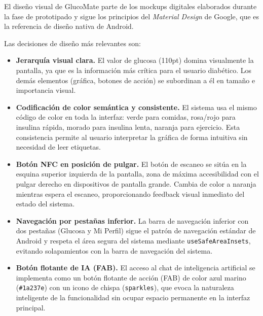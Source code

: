 El diseño visual de GlucoMate parte de los mockups digitales elaborados durante la
fase de prototipado y sigue los principios del \textit{Material Design} de Google,
que es la referencia de diseño nativa de Android.

Las decisiones de diseño más relevantes son:

\begin{itemize}
    \item \textbf{Jerarquía visual clara.} El valor de glucosa (110pt) domina
          visualmente la pantalla, ya que es la información más crítica para el
          usuario diabético. Los demás elementos (gráfica, botones de acción) se
          subordinan a él en tamaño e importancia visual.

    \item \textbf{Codificación de color semántica y consistente.} El sistema usa
          el mismo código de color en toda la interfaz: verde para comidas, rosa/rojo
          para insulina rápida, morado para insulina lenta, naranja para ejercicio.
          Esta consistencia permite al usuario interpretar la gráfica de forma
          intuitiva sin necesidad de leer etiquetas.

    \item \textbf{Botón NFC en posición de pulgar.} El botón de escaneo se sitúa
          en la esquina superior izquierda de la pantalla, zona de máxima
          accesibilidad con el pulgar derecho en dispositivos de pantalla grande.
          Cambia de color a naranja mientras espera el escaneo, proporcionando
          feedback visual inmediato del estado del sistema.

    \item \textbf{Navegación por pestañas inferior.} La barra de navegación
          inferior con dos pestañas (Glucosa y Mi Perfil) sigue el patrón de
          navegación estándar de Android y respeta el área segura del sistema
          mediante \texttt{useSafeAreaInsets}, evitando solapamientos con la
          barra de navegación del sistema.

    \item \textbf{Botón flotante de IA (FAB).} El acceso al chat de inteligencia
          artificial se implementa como un botón flotante de acción (FAB) de color
          azul marino (\texttt{\#1a237e}) con un icono de chispa (\texttt{sparkles}),
          que evoca la naturaleza inteligente de la funcionalidad sin ocupar espacio
          permanente en la interfaz principal.
\end{itemize}

